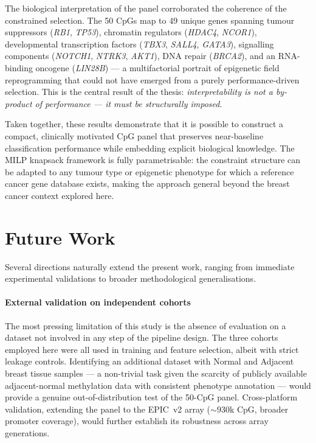 The biological interpretation of the panel corroborated the coherence of
the constrained selection.
The 50 CpGs map to 49 unique genes spanning tumour suppressors
(\textit{RB1}, \textit{TP53}), chromatin regulators (\textit{HDAC4},
\textit{NCOR1}), developmental transcription factors (\textit{TBX3},
\textit{SALL4}, \textit{GATA3}), signalling components (\textit{NOTCH1},
\textit{NTRK3}, \textit{AKT1}), DNA repair (\textit{BRCA2}), and an
RNA-binding oncogene (\textit{LIN28B}) --- a multifactorial portrait of
epigenetic field reprogramming that could not have emerged from a purely
performance-driven selection.
This is the central result of the thesis: \emph{interpretability is not a
by-product of performance --- it must be structurally imposed}.

Taken together, these results demonstrate that it is possible to construct a
compact, clinically motivated CpG panel that preserves near-baseline
classification performance while embedding explicit biological knowledge.
The MILP knapsack framework is fully parametrisable: the constraint
structure can be adapted to any tumour type or epigenetic phenotype for
which a reference cancer gene database exists, making the approach general
beyond the breast cancer context explored here.



\section{Future Work}
\label{sec:future_work}

Several directions naturally extend the present work, ranging from
immediate experimental validations to broader methodological
generalisations.

\paragraph{External validation on independent cohorts}
The most pressing limitation of this study is the absence of evaluation on
a dataset not involved in any step of the pipeline design.
The three cohorts employed here were all used in training and feature
selection, albeit with strict leakage controls.
Identifying an additional dataset with Normal and Adjacent breast
tissue samples --- a non-trivial task given the scarcity of publicly
available adjacent-normal methylation data with consistent phenotype
annotation --- would provide a genuine out-of-distribution test of the
50-CpG panel.
Cross-platform validation, extending the panel to the EPIC~v2 array
(${\sim}930$k CpG, broader promoter coverage), would further establish its
robustness across array generations.

